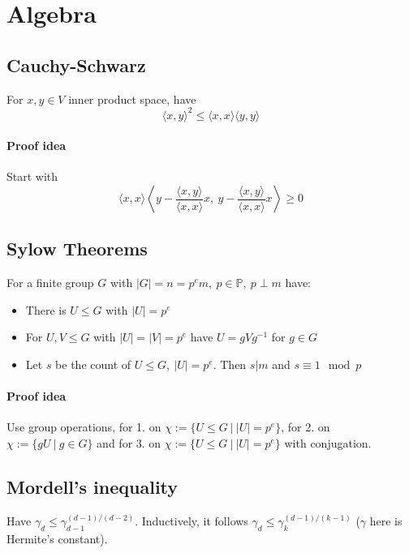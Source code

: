\documentclass{scrartcl}
\begin{document}
\section{Algebra}

\subsection{Cauchy-Schwarz}

For $x, y \in V$ inner product space, have
\begin{equation}
    \langle x, y \rangle^2 \leq \langle x, x \rangle \langle y, y \rangle \nonumber
\end{equation}
\paragraph{Proof idea} Start with
\begin{equation}
    \langle x, x \rangle \left\langle y - \frac {\langle x, y \rangle}{\langle x, x \rangle} x, \ y - \frac {\langle x, y \rangle}{\langle x, x \rangle} x \right\rangle \geq 0 \nonumber
\end{equation}

\subsection{Sylow Theorems}

For a finite group $G$ with $|G| = n = p^em, \ p \in \mathbb{P}, \ p \perp m$ have:
\begin{itemize}
    \item There is $U \leq G$ with $|U| = p^e$
    \item For $U, V \leq G$ with $|U| = |V| = p^e$ have $U = gVg^{-1}$ for $g \in G$
    \item Let $s$ be the count of $U \leq G, \ |U| = p^e$. Then $s | m$ and $s \equiv 1 \mod p$
\end{itemize}

\paragraph{Proof idea} Use group operations, for 1. on $\chi := \{ U \leq G \ | \ |U| = p^e \}$, for 2. on $\chi := \{ gU \ | \ g \in G \}$ and for 3. on $\chi := \{ U \leq G \ | \ |U| = p^e \}$ with conjugation.

\subsection{Mordell's inequality}
Have $\gamma_d \leq \gamma_{d-1}^{(d - 1) / (d - 2)}$. Inductively, it follows $\gamma_d \leq \gamma_k^{(d-1)/(k-1)}$ ($\gamma$ here is Hermite's constant).
\end{document}
